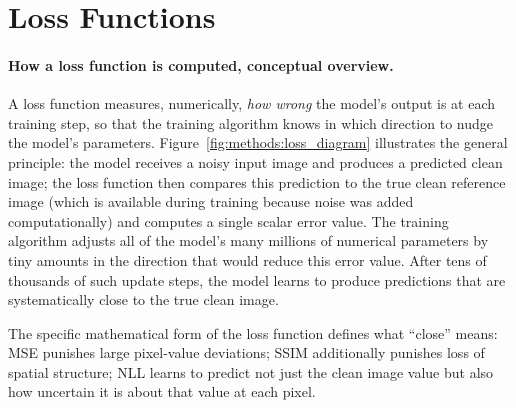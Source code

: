 \documentclass[12pt, a4paper, twoside, openright]{book}
\begin{document}
\section{Loss Functions}
\label{sec:methods:loss}

\paragraph{How a loss function is computed, conceptual overview.}
A loss function measures, numerically, \emph{how wrong} the model's output is at each training step, so that the training algorithm knows in which direction to nudge the model's parameters. Figure~\ref{fig:methods:loss_diagram} illustrates the general principle: the model receives a noisy input image and produces a predicted clean image; the loss function then compares this prediction to the true clean reference image (which is available during training because noise was added computationally) and computes a single scalar error value. The training algorithm adjusts all of the model's many millions of numerical parameters by tiny amounts in the direction that would reduce this error value. After tens of thousands of such update steps, the model learns to produce predictions that are systematically close to the true clean image.

The specific mathematical form of the loss function defines what ``close'' means: MSE punishes large pixel-value deviations; SSIM additionally punishes loss of spatial structure; NLL learns to predict not just the clean image value but also how uncertain it is about that value at each pixel.
\end{document}
